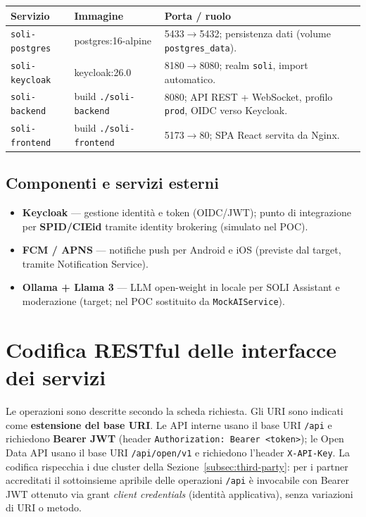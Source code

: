 \documentclass[11pt,a4paper]{article}
\begin{document}
\begin{xltabular}{\linewidth}{|L{3.0cm}|L{3.6cm}|Y|}
\hline
{}\color{white}\bfseries Servizio & \color{white}\bfseries Immagine & \color{white}\bfseries Porta / ruolo\\\hline
\endhead
\texttt{soli-postgres} & postgres:16-alpine & 5433$\to$5432; persistenza dati (volume \texttt{postgres\_data}).\\\hline
\texttt{soli-keycloak} & keycloak:26.0 & 8180$\to$8080; realm \texttt{soli}, import automatico.\\\hline
\texttt{soli-backend} & build \texttt{./soli-backend} & 8080; API REST + WebSocket, profilo \texttt{prod}, OIDC verso Keycloak.\\\hline
\texttt{soli-frontend} & build \texttt{./soli-frontend} & 5173$\to$80; SPA React servita da Nginx.\\\hline
\end{xltabular}

\subsection{Componenti e servizi esterni}
\begin{itemize}[leftmargin=1.4em]
  \item \textbf{Keycloak} --- gestione identit\`a e token (OIDC/JWT); punto di integrazione per \textbf{SPID/CIEid} tramite identity brokering (simulato nel POC).
  \item \textbf{FCM / APNS} --- notifiche push per Android e iOS (previste dal target, tramite Notification Service).
  \item \textbf{Ollama + Llama 3} --- LLM open-weight in locale per SOLI Assistant e moderazione (target; nel POC sostituito da \texttt{MockAIService}).
\end{itemize}

\section{Codifica RESTful delle interfacce dei servizi}
\label{sec:rest}

Le operazioni sono descritte secondo la scheda richiesta. Gli URI sono indicati come \textbf{estensione del base URI}. Le API interne usano il base URI \texttt{/api} e richiedono \textbf{Bearer JWT} (header \texttt{Authorization: Bearer <token>}); le Open Data API usano il base URI \texttt{/api/open/v1} e richiedono l'header \texttt{X-API-Key}. La codifica rispecchia i due cluster della Sezione~\ref{subsec:third-party}: per i partner accreditati il sottoinsieme apribile delle operazioni \texttt{/api} \`e invocabile con Bearer JWT ottenuto via grant \emph{client credentials} (identit\`a applicativa), senza variazioni di URI o metodo.
\end{document}
